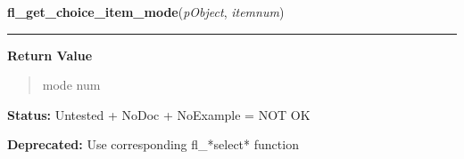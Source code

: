 \hspace{.8\funcindent}\begin{boxedminipage}{\funcwidth}

    \raggedright \textbf{fl\_get\_choice\_item\_mode}(\textit{pObject}, \textit{itemnum})

    \vspace{-1.5ex}

    \rule{\textwidth}{0.5\fboxrule}
\setlength{\parskip}{2ex}
\setlength{\parskip}{1ex}
      \textbf{Return Value}
    \vspace{-1ex}

      \begin{quote}
      mode num

      \end{quote}

\textbf{Status:} Untested + NoDoc + NoExample = NOT OK



\textbf{Deprecated:} Use corresponding fl\_*select* function



    \end{boxedminipage}

    \label{xformslib:deprecated:fl_set_choice_item_mode}

    \vspace{0.5ex}

